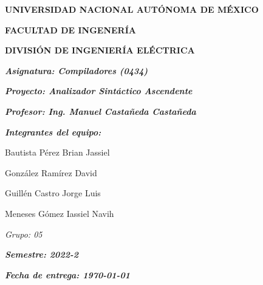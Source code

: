 \documentclass[letterpaper]{article}
\begin{document}
\begin{figure}
    \hfill
\end{figure}

\begin{titlepage}
    \centering
    {\bfseries\LARGE UNIVERSIDAD NACIONAL AUTÓNOMA DE MÉXICO \par}
    \vspace{1cm}
    {\bfseries\LARGE FACULTAD DE INGENERÍA \par}
    \vspace{1cm}
    {\bfseries\LARGE DIVISIÓN DE INGENIERÍA ELÉCTRICA \par}
    \vspace{1cm}
    {\itshape\Large\textbf{Asignatura: Compiladores (0434)}\par}
    \vspace{1cm}
    {\itshape\Large\textbf{Proyecto: Analizador Sintáctico Ascendente}\par}
    \vspace{1cm}
    {\itshape\Large \textbf{Profesor: Ing. Manuel Castañeda Castañeda}\par}
    \vspace{1cm}
    \vfill
    {\itshape\Large \textbf{Integrantes del equipo:}\\\par}
    \begin{itemize}
        \centering
        {\itshape\Large
        \item [\textbullet] Bautista Pérez Brian Jassiel
        \item [\textbullet] González Ramírez David
        \item [\textbullet] Guillén Castro Jorge Luis
        \item [\textbullet] Meneses Gómez Iassiel Navih}
    \end{itemize}
    \vfill
    {\itshape\Large Grupo: 05\par}
    {\itshape\Large \textbf{Semestre: 2022-2}\par}
    {\itshape\Large \textbf{Fecha de entrega: \today}\par}
\end{titlepage}
\end{document}
